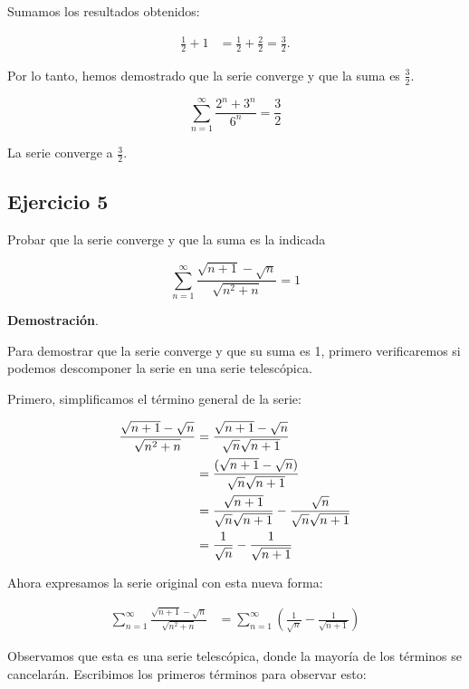 \documentclass{article}
\begin{document}
    Sumamos los resultados obtenidos:

    \begin{align*}
    \frac{1}{2} + 1 &= \frac{1}{2} + \frac{2}{2} = \frac{3}{2}.
    \end{align*}

    Por lo tanto, hemos demostrado que la serie converge y que la suma es $\frac{3}{2}$.

    \begin{equation}
    \sum_{n=1}^{\infty} \frac{2^{n} + 3^{n}}{6^{n}} = \frac{3}{2}
    \end{equation}

    La serie converge a $\frac{3}{2}$.

    \subsection*{Ejercicio 5}

    Probar que la serie converge y que la suma es la indicada

    $$
    \sum_{n=1}^{\infty} \frac{\sqrt{n+1}-\sqrt{n}}{\sqrt{n^{2}+n}}=1
    $$

    \textbf{Demostración}.

    Para demostrar que la serie converge y que su suma es 1, primero verificaremos si podemos descomponer la serie en una serie telescópica.

    Primero, simplificamos el término general de la serie:

    \begin{align*}
    \frac{\sqrt{n+1}-\sqrt{n}}{\sqrt{n^{2}+n}} &= \frac{\sqrt{n+1}-\sqrt{n}}{\sqrt{n} \sqrt{n+1}} \notag \\
    &= \frac{(\sqrt{n+1}-\sqrt{n})}{\sqrt{n} \sqrt{n+1}} \notag \\
    &= \frac{\sqrt{n+1}}{\sqrt{n} \sqrt{n+1}} - \frac{\sqrt{n}}{\sqrt{n} \sqrt{n+1}} \notag \\
    &= \frac{1}{\sqrt{n}} - \frac{1}{\sqrt{n+1}}
    \end{align*}

    Ahora expresamos la serie original con esta nueva forma:

    \begin{align*}
    \sum_{n=1}^{\infty} \frac{\sqrt{n+1}-\sqrt{n}}{\sqrt{n^{2}+n}} &= \sum_{n=1}^{\infty} \left(\frac{1}{\sqrt{n}} - \frac{1}{\sqrt{n+1}}\right)
    \end{align*}

    Observamos que esta es una serie telescópica, donde la mayoría de los términos se cancelarán.
    Escribimos los primeros términos para observar esto:
\end{document}
